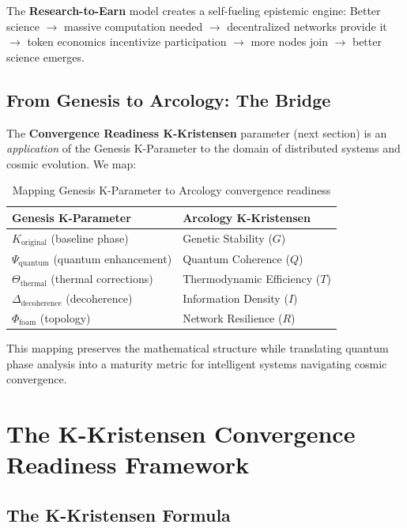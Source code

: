 \documentclass[12pt,a4paper]{article}
\begin{document}
The \textbf{Research-to-Earn} model creates a self-fueling epistemic engine:
Better science $\rightarrow$ massive computation needed $\rightarrow$
decentralized networks provide it $\rightarrow$ token economics incentivize participation $\rightarrow$
more nodes join $\rightarrow$ better science emerges.

\subsection{From Genesis to Arcology: The Bridge}

The \textbf{Convergence Readiness K-Kristensen} parameter (next section) is an
\textit{application} of the Genesis K-Parameter to the domain of distributed systems
and cosmic evolution. We map:

\begin{table}[H]
\centering
\begin{tabular}{ll}
\toprule
\textbf{Genesis K-Parameter} & \textbf{Arcology K-Kristensen} \\
\midrule
$K_{\text{original}}$ (baseline phase) & Genetic Stability ($G$) \\
$\Psi_{\text{quantum}}$ (quantum enhancement) & Quantum Coherence ($Q$) \\
$\Theta_{\text{thermal}}$ (thermal corrections) & Thermodynamic Efficiency ($T$) \\
$\Delta_{\text{decoherence}}$ (decoherence) & Information Density ($I$) \\
$\Phi_{\text{foam}}$ (topology) & Network Resilience ($R$) \\
\bottomrule
\end{tabular}
\caption{Mapping Genesis K-Parameter to Arcology convergence readiness}
\end{table}

This mapping preserves the mathematical structure while translating quantum phase
analysis into a maturity metric for intelligent systems navigating cosmic convergence.

\section{The K-Kristensen Convergence Readiness Framework}

\subsection{The K-Kristensen Formula}
\end{document}
